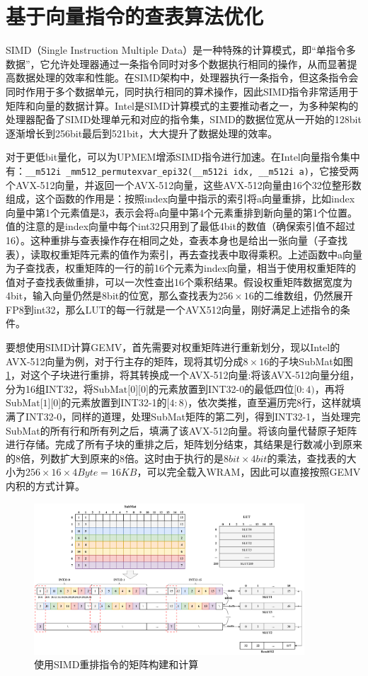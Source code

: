 \section{基于向量指令的查表算法优化}
SIMD（Single Instruction Multiple Data）是一种特殊的计算模式，即“单指令多数据”，它允许处理器通过一条指令同时对多个数据执行相同的操作，从而显著提高数据处理的效率和性能。在SIMD架构中，处理器执行一条指令，但这条指令会同时作用于多个数据单元，同时执行相同的算术操作，因此SIMD指令非常适用于矩阵和向量的数据计算。Intel是SIMD计算模式的主要推动者之一，为多种架构的处理器配备了SIMD处理单元和对应的指令集\cite{IntelAVX}，SIMD的数据位宽从一开始的128bit逐渐增长到256bit最后到521bit，大大提升了数据处理的效率。

对于更低bit量化，可以为UPMEM增添SIMD指令进行加速。在Intel向量指令集中有：\verb|__m512i _mm512_permutexvar_epi32(__m512i idx, __m512i a)|，它接受两个AVX-512向量，并返回一个AVX-512向量，这些AVX-512向量由16个32位整形数组成，这个函数的作用是：按照index向量中指示的索引将a向量重排，比如index向量中第1个元素值是3，表示会将a向量中第4个元素重排到新向量的第1个位置。值的注意的是index向量中每个int32只用到了最低4bit的数值（确保索引值不超过16）。这种重排与查表操作存在相同之处，查表本身也是给出一张向量（子查找表），读取权重矩阵元素的值作为索引，再去查找表中取得乘积。上述函数中a向量为子查找表，权重矩阵的一行的前16个元素为index向量，相当于使用权重矩阵的值对子查找表做重排，可以一次性查出16个乘积结果。假设权重矩阵数据宽度为4bit，输入向量仍然是8bit的位宽，那么查找表为$256\times 16$的二维数组，仍然展开FP8到int32，那么LUT的每一行就是一个AVX512向量，刚好满足上述指令的条件。

要想使用SIMD计算GEMV，首先需要对权重矩阵进行重新划分，现以Intel的AVX-512向量为例，对于行主存的矩阵，现将其切分成$8\times 16$的子块SubMat如图\ref{SIMD}，对这个子块进行重排，将其转换成一个AVX-512向量:将该AVX-512向量分组，分为16组INT32，将$\text{SubMat[0][0]}$的元素放置到INT32-0的最低四位$[0:4)$，再将$\text{SubMat[1][0]}$的元素放置到INT32-1的$[4:8)$，依次类推，直至遍历完8行，这样就填满了INT32-0，同样的道理，处理SubMat矩阵的第二列，得到INT32-1，当处理完SubMat的所有行和所有列之后，填满了该AVX-512向量。将该向量代替原子矩阵进行存储。完成了所有子块的重排之后，矩阵划分结束，其结果是行数减小到原来的8倍，列数扩大到原来的8倍。这时由于执行的是$8bit\times 4bit$的乘法，查找表的大小为$256\times 16\times 4Byte=16KB$，可以完全载入WRAM，因此可以直接按照GEMV内积的方式计算。

\begin{figure}[!htbp]
	\centering
    \includegraphics[width=0.9\textwidth]{figures/SIMD.pdf}
	\caption{使用SIMD重排指令的矩阵构建和计算}
    \label{SIMD}
\end{figure}

